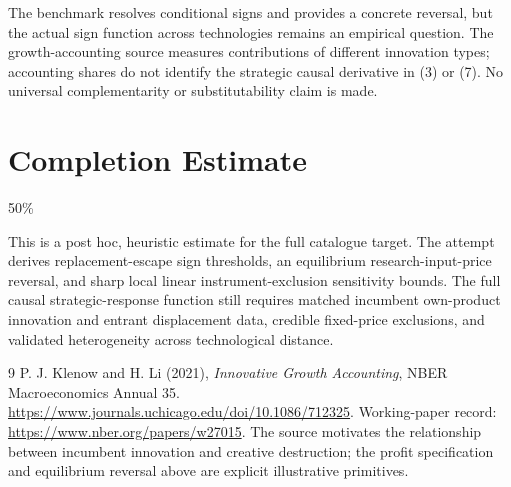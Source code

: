 \documentclass[11pt,a4paper]{article}
\begin{document}
The benchmark resolves conditional signs and provides a concrete reversal, but the actual sign function across technologies remains an empirical question. The growth-accounting source measures contributions of different innovation types; accounting shares do not identify the strategic causal derivative in (3) or (7). No universal complementarity or substitutability claim is made.

\section{Completion Estimate}
50\%

This is a post hoc, heuristic estimate for the full catalogue target.
The attempt derives replacement-escape sign thresholds, an equilibrium research-input-price reversal, and sharp local linear instrument-exclusion sensitivity bounds. The full causal strategic-response function still requires matched incumbent own-product innovation and entrant displacement data, credible fixed-price exclusions, and validated heterogeneity across technological distance.

\begin{thebibliography}{9}
 P. J. Klenow and H. Li (2021), \emph{Innovative Growth Accounting}, NBER Macroeconomics Annual 35. \url{https://www.journals.uchicago.edu/doi/10.1086/712325}. Working-paper record: \url{https://www.nber.org/papers/w27015}. The source motivates the relationship between incumbent innovation and creative destruction; the profit specification and equilibrium reversal above are explicit illustrative primitives.
\end{thebibliography}
\end{document}
